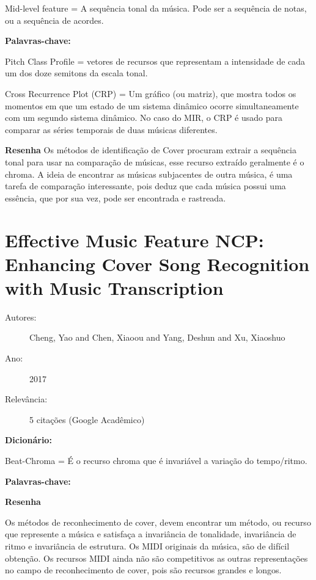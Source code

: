 \item Mid-level feature = A sequência tonal da música. Pode ser a sequência de notas, ou a sequência de acordes.

{\bfseries Palavras-chave:}

\item Pitch Class Profile = vetores de recursos que representam a intensidade de cada um dos doze semitons da escala tonal.

\item Cross Recurrence Plot (CRP) = Um gráfico (ou matriz), que mostra todos os momentos em que um estado de um sistema dinâmico ocorre simultaneamente com um segundo sistema dinâmico. No caso do MIR, o CRP é usado para comparar as séries temporais de duas músicas diferentes.

{\bfseries Resenha}
Os métodos de identificação de Cover procuram extrair a sequência tonal para usar na comparação de músicas, esse recurso extraído geralmente é o chroma. A ideia de encontrar as músicas subjacentes de outra música, é uma tarefa de comparação interessante, pois deduz que cada música possui uma essência, que por sua vez, pode ser encontrada e rastreada. 

\section{Effective Music Feature NCP: Enhancing Cover Song Recognition with Music Transcription}

\begin{description}
\item[Autores:] Cheng, Yao and Chen, Xiaoou and Yang, Deshun and Xu, Xiaoshuo
\item[Ano:] 2017
\item[Relevância:] 5 citações (Google Acadêmico)
\end{description}

{\bfseries Dicionário:}

\item Beat-Chroma = É o recurso chroma que é invariável a variação do tempo/ritmo.

{\bfseries Palavras-chave:}


{\bfseries Resenha}

Os métodos de reconhecimento de cover, devem encontrar um método, ou recurso que represente a música e satisfaça a invariância de tonalidade, invariância de ritmo e invariância de estrutura. Os MIDI originais da música, são de difícil obtenção. Os recursos MIDI ainda não são competitivos as outras representações no campo de reconhecimento de cover, pois são recursos grandes e longos.

